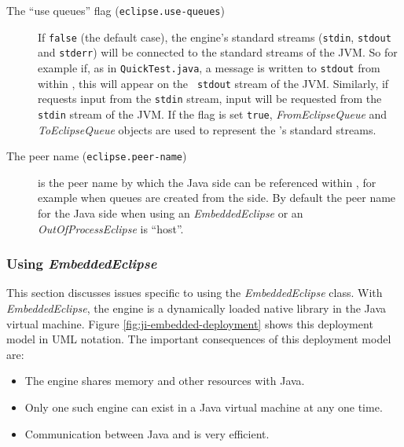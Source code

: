 \begin{description}
\item [The ``use queues'' flag ({\tt eclipse.use-queues})]
\label{sec:ji-use-queues-flag} If {\tt false} (the default case), the
{\eclipse} engine's standard streams ({\tt stdin}, {\tt stdout} and
{\tt stderr}) will be connected to the standard streams of the JVM. So
for example if, as in {\tt QuickTest.java}, a message is written to
{\tt stdout} from within {\eclipse}, this will appear on the {\tt
stdout} stream of the JVM. Similarly, if {\eclipse} requests input
from the {\tt stdin} stream, input will be requested from the {\tt
stdin} stream of the JVM. If the flag is set {\tt true}, {\it
FromEclipseQueue} and {\it ToEclipseQueue} objects are used to
represent the {\eclipse}'s standard streams.

\item [The peer name ({\tt eclipse.peer-name})] is the peer name by
which the Java side can be referenced within {\eclipse}, for example when
queues are created from the {\eclipse} side. By default the peer name for
the Java side when using an {\it EmbeddedEclipse} or an {\it OutOfProcessEclipse} is ``host''.

\end{description}

\subsubsection{Using {\it EmbeddedEclipse}}

This section discusses issues specific to using the {\it
EmbeddedEclipse} class. With {\it EmbeddedEclipse}, the {\eclipse} engine
is a dynamically loaded native library in the Java virtual machine. Figure
\ref{fig:ji-embedded-deployment} shows this deployment model in UML
notation. The important consequences of this deployment model are:

\begin{itemize}
\item The {\eclipse} engine shares memory and other resources with Java. 
\item Only one such engine can exist in a Java virtual machine at any one time.
\item Communication between Java and {\eclipse} is very efficient.
\end{itemize}




